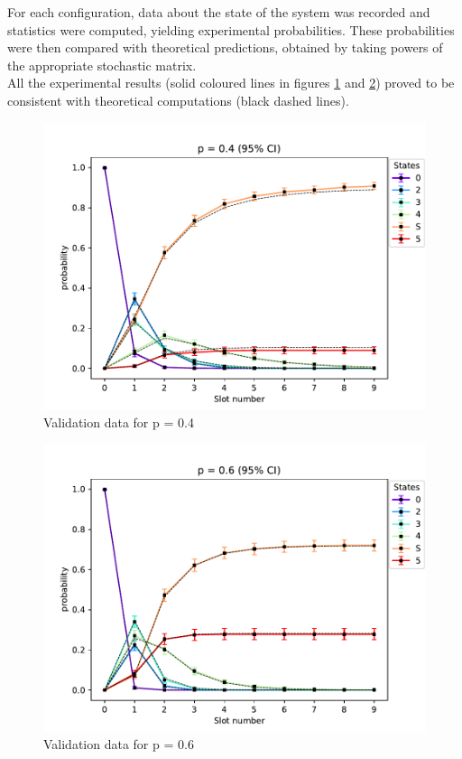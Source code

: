 For each configuration, data about the state of the system was recorded and
statistics were computed, yielding experimental probabilities. These
probabilities were then compared with theoretical predictions, obtained by
taking powers of the appropriate stochastic matrix.\\
All the experimental results (solid coloured lines in figures
\ref{fig:5to1validPlot1} and \ref{fig:5to1validPlot2}) proved to be consistent
with theoretical computations (black dashed lines).
\begin{figure}[H]
    \begin{center}
        \includegraphics[scale=0.7]{img/star5to1p=0.4validation.pdf}
        \caption{Validation data for p = 0.4}
        \label{fig:5to1validPlot1}
    \end{center}
    \vspace*{-0.8cm}
\end{figure}
\begin{figure}[H]
    \begin{center}
        \includegraphics[scale=0.7]{img/star5to1p=0.6validation.pdf}
        \caption{Validation data for p = 0.6}
        \label{fig:5to1validPlot2}
    \end{center}
    \vspace*{-0.8cm}
\end{figure}
